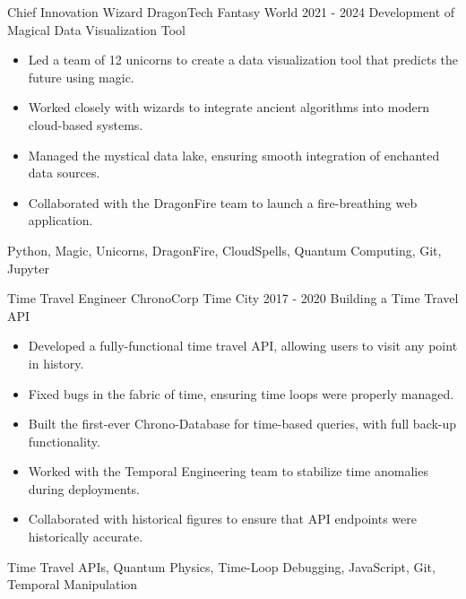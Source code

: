 
\begin{sidesection}
    \experience
        {Chief Innovation Wizard} %
        {DragonTech} %
        {Fantasy World} %
        {2021 - 2024} %
        {Development of Magical Data Visualization Tool} %
        {
        \begin{itemize}
            \item {Led a team of 12 unicorns to create a data visualization tool that predicts the future using magic.}
            \item {Worked closely with wizards to integrate ancient algorithms into modern cloud-based systems.}
            \item {Managed the mystical data lake, ensuring smooth integration of enchanted data sources.}
            \item {Collaborated with the DragonFire team to launch a fire-breathing web application.}
        \end{itemize}
        }
        {Python, Magic, Unicorns, DragonFire, CloudSpells, Quantum Computing, Git, Jupyter}

    \vspace{1ex}

    \experience
        {Time Travel Engineer} %
        {ChronoCorp} %
        {Time City} %
        {2017 - 2020} %
        {Building a Time Travel API} %
        {
        \begin{itemize}
            \item {Developed a fully-functional time travel API, allowing users to visit any point in history.}
            \item {Fixed bugs in the fabric of time, ensuring time loops were properly managed.}
            \item {Built the first-ever Chrono-Database for time-based queries, with full back-up functionality.}
            \item {Worked with the Temporal Engineering team to stabilize time anomalies during deployments.}
            \item {Collaborated with historical figures to ensure that API endpoints were historically accurate.}
        \end{itemize}
        }
        {Time Travel APIs, Quantum Physics, Time-Loop Debugging, JavaScript, Git, Temporal Manipulation}


\end{sidesection}

